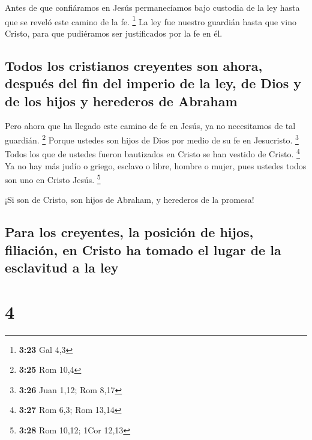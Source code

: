  Antes de que confiáramos en Jesús permanecíamos bajo
custodia de la ley hasta que se reveló este camino de la fe. \footnote{\textbf{3:23}
  Gal 4,3}  La ley fue nuestro guardián hasta que vino
Cristo, para que pudiéramos ser justificados por la fe en él.

\hypertarget{todos-los-cristianos-creyentes-son-ahora-despuuxe9s-del-fin-del-imperio-de-la-ley-de-dios-y-de-los-hijos-y-herederos-de-abraham}{%
\subsection{Todos los cristianos creyentes son ahora, después del fin
del imperio de la ley, de Dios y de los hijos y herederos de
Abraham}\label{todos-los-cristianos-creyentes-son-ahora-despuuxe9s-del-fin-del-imperio-de-la-ley-de-dios-y-de-los-hijos-y-herederos-de-abraham}}

 Pero ahora que ha llegado este camino de fe en Jesús, ya
no necesitamos de tal guardián. \footnote{\textbf{3:25} Rom 10,4}
 Porque ustedes son hijos de Dios por medio de su fe en
Jesucristo. \footnote{\textbf{3:26} Juan 1,12; Rom 8,17} 
Todos los que de ustedes fueron bautizados en Cristo se han vestido de
Cristo. \footnote{\textbf{3:27} Rom 6,3; Rom 13,14}  Ya
no hay más judío o griego, esclavo o libre, hombre o mujer, pues ustedes
todos son uno en Cristo Jesús. \footnote{\textbf{3:28} Rom 10,12; 1Cor
  12,13}

 ¡Si son de Cristo, son hijos de Abraham, y herederos de
la promesa!

\hypertarget{para-los-creyentes-la-posiciuxf3n-de-hijos-filiaciuxf3n-en-cristo-ha-tomado-el-lugar-de-la-esclavitud-a-la-ley}{%
\subsection{Para los creyentes, la posición de hijos, filiación, en
Cristo ha tomado el lugar de la esclavitud a la
ley}\label{para-los-creyentes-la-posiciuxf3n-de-hijos-filiaciuxf3n-en-cristo-ha-tomado-el-lugar-de-la-esclavitud-a-la-ley}}

\hypertarget{section-3}{%
\section{4}\label{section-3}}

